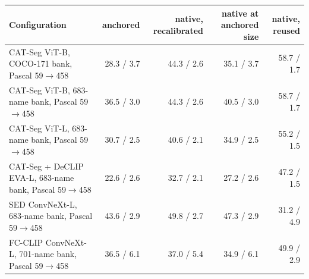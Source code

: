 \begin{tabular}{@{}lrrrr@{}}
\toprule
Configuration & anchored & native, recalibrated & native at anchored size & native, reused \\
\midrule
CAT-Seg ViT-B, COCO-171 bank, Pascal 59$\to$458 & 28.3 / 3.7 & 44.3 / 2.6 & 35.1 / 3.7 & 58.7 / 1.7 \\
CAT-Seg ViT-B, 683-name bank, Pascal 59$\to$458 & 36.5 / 3.0 & 44.3 / 2.6 & 40.5 / 3.0 & 58.7 / 1.7 \\
CAT-Seg ViT-L, 683-name bank, Pascal 59$\to$458 & 30.7 / 2.5 & 40.6 / 2.1 & 34.9 / 2.5 & 55.2 / 1.5 \\
CAT-Seg + DeCLIP EVA-L, 683-name bank, Pascal 59$\to$458 & 22.6 / 2.6 & 32.7 / 2.1 & 27.2 / 2.6 & 47.2 / 1.5 \\
SED ConvNeXt-L, 683-name bank, Pascal 59$\to$458 & 43.6 / 2.9 & 49.8 / 2.7 & 47.3 / 2.9 & 31.2 / 4.9 \\
FC-CLIP ConvNeXt-L, 701-name bank, Pascal 59$\to$458 & 36.5 / 6.1 & 37.0 / 5.4 & 34.9 / 6.1 & 49.9 / 2.9 \\
\bottomrule
\end{tabular}
